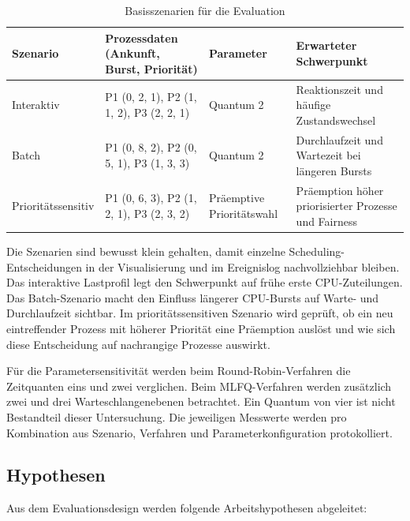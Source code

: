 \begin{table}[htbp]
    \centering
    \small
    \caption{Basisszenarien für die Evaluation}
    \label{tab:evaluationsszenarien}
    \begin{tabular}{p{}p{}p{}p{}}
        \toprule
        Szenario             & Prozessdaten \newline (Ankunft, Burst, Priorität) & Parameter                 & Erwarteter Schwerpunkt                               \\
        \midrule
        Interaktiv           & P1 (0, 2, 1), P2 (1, 1, 2), P3 (2, 2, 1)          & Quantum 2                 & Reaktionszeit und häufige Zustandswechsel            \\
        Batch                & P1 (0, 8, 2), P2 (0, 5, 1), P3 (1, 3, 3)          & Quantum 2                 & Durchlaufzeit und Wartezeit bei längeren Bursts      \\
        Prioritäts\-sensitiv & P1 (0, 6, 3), P2 (1, 2, 1), P3 (2, 3, 2)          & Präemptive Prioritätswahl & Präemption höher priorisierter Prozesse und Fairness \\
        \bottomrule
    \end{tabular}
\end{table}

Die Szenarien sind bewusst klein gehalten, damit einzelne Scheduling-Entscheidungen in der Visualisierung und im Ereignislog nachvollziehbar bleiben. Das interaktive Lastprofil legt den Schwerpunkt auf frühe erste CPU-Zuteilungen. Das Batch-Szenario macht den Einfluss längerer CPU-Bursts auf Warte- und Durchlaufzeit sichtbar. Im prioritätssensitiven Szenario wird geprüft, ob ein neu eintreffender Prozess mit höherer Priorität eine Präemption auslöst und wie sich diese Entscheidung auf nachrangige Prozesse auswirkt.

Für die Parametersensitivität werden beim Round-Robin-Verfahren die Zeitquanten eins und zwei verglichen. Beim MLFQ-Verfahren werden zusätzlich zwei und drei Warteschlangenebenen betrachtet. Ein Quantum von vier ist nicht Bestandteil dieser Untersuchung. Die jeweiligen Messwerte werden pro Kombination aus Szenario, Verfahren und Parameterkonfiguration protokolliert.

\subsection{Hypothesen}

Aus dem Evaluationsdesign werden folgende Arbeitshypothesen abgeleitet:

